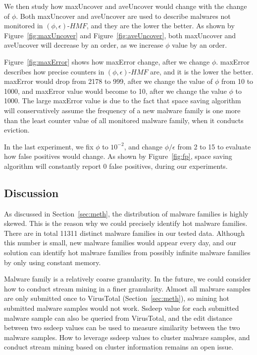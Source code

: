 We then study how maxUncover and aveUncover would change with the change of $\phi$.
Both maxUncover and aveUncover are used to describe malwares not monitored in $(\phi, \epsilon)\mbox{-}HMF$, 
and they are the lower the better. As shown by Figure~\ref{fig:maxUncover} and Figure~\ref{fig:aveUncover}, 
both maxUncover and aveUncover will decrease by an order, as we increase $\phi$ value by an order. 

Figure~\ref{fig:maxError} shows how maxError change, 
after we change $\phi$. 
maxError describes how precise counters in $(\phi, \epsilon)\mbox{-}HMF$ are, 
and it is the lower the better. 
maxError would drop from 2178 to 999, after we change the value of $\phi$ from 10 to 1000, 
and maxError value would become to 10, after we change the value $\phi$ to 1000. 
The large maxError value is due to the fact that space saving algorithm will conservatively 
assume the frequency of a new malware family is one more than the least counter value of all monitored malware family, 
when it conducts eviction. 

In the last experiment, we fix $\phi$ to $10^{-2}$, 
and change $\phi/\epsilon$ from 2 to 15 to evaluate how false positives would change. 
As shown by Figure~\ref{fig:fp}, space saving algorithm will constantly report 0 false positives, during our experiments. 

\subsection{Discussion}
\label{sec:discussion1}
As discussed in Section~\ref{sec:meth}, 
the distribution of malware families is highly skewed. 
This is the reason why we could precisely identify hot malware families. 
There are in total 11311 distinct malware families in our tested data. 
Although this number is small, new malware families would appear every day, 
and our solution can identify hot malware families from possibly 
infinite malware families by only using constant memory. 

Malware family is a relatively coarse granularity. 
In the future, we could consider how to conduct stream mining in a finer granularity. 
Almost all malware samples are only submitted once to VirusTotal (Section~\ref{sec:meth}), 
so mining hot submitted malware samples would not work. 
Ssdeep value for each submitted malware sample can also be queried from VirusTotal, 
and the edit distance between two ssdeep values can be used to measure similarity between the two malware samples. 
How to leverage ssdeep values to cluster malware samples, 
and conduct stream mining based on cluster information remains an open issue.  
